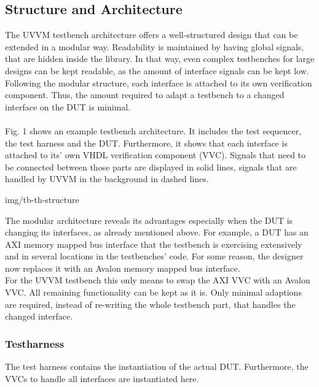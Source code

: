 \subsection{Structure and Architecture}

The UVVM testbench architecture offers a well-structured design that can be extended in a modular way. Readability is maintained by having global signals, that are hidden inside the library. In that way, even complex testbenches for large designs can be kept readable, as the amount of interface signals can be kept low. Following the modular structure, each interface is attached to its own verification component. Thus, the amount required to adapt a testbench to a changed interface on the DUT is minimal. \\
\\
Fig. 1 shows an example testbench architecture. It includes the test sequencer, the test harness and the DUT. Furthermore, it shows that each interface is attached to its' own VHDL verification component (VVC). Signals that need to be connected between those parts are displayed in solid lines, signals that are handled by UVVM in the background in dashed lines.

 {img/tb-th-structure}

The modular architecture reveals its advantages especially when the DUT is changing its interfaces, as already mentioned above. For example, a DUT has an AXI memory mapped bus interface that the testbench is exercising extensively and in several locations in the testbenches' code. For some reason, the designer now replaces it with an Avalon memory mapped bus interface. \\
For the UVVM testbench this only means to swap the AXI VVC with an Avalon VVC. All remaining functionality can be kept as it is. Only minimal adaptions are required, instead of re-writing the whole testbench part, that handles the changed interface.


\subsubsection{Testharness}

The test harness contains the instantiation of the actual DUT. Furthermore, the VVCs to handle all interfaces are instantiated here.

